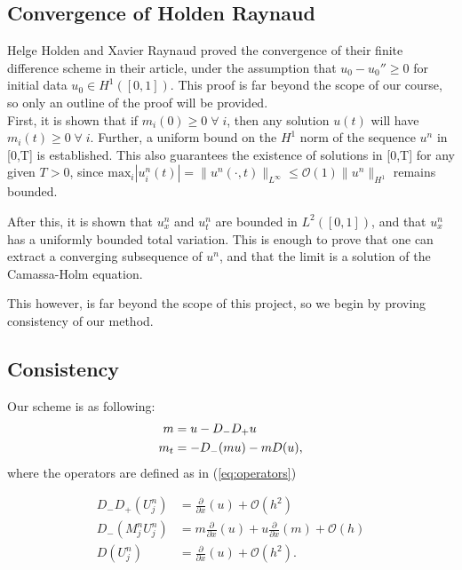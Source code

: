 \subsection*{Convergence of Holden Raynaud}
Helge Holden and Xavier Raynaud proved the convergence of their finite difference scheme in their article, under the assumption that $u_{0} - u_{0}'' \geq 0$ for initial data $u_{0} \in H^{1}([0,1])$. This proof is far beyond the scope of our course, so only an outline of the proof will be provided. \\

First, it is shown that if $m_{i}(0) \geq 0 \; \forall \;i$, then any solution $u(t)$ will have $m_{i}(t) \geq 0 \; \forall \;i $. Further, a uniform bound on the $H^{1}$ norm of the sequence $u^{n}$ in [0,T] is established. This also guarantees the existence of solutions in [0,T] for any given $T > 0$, since $\text{max}_{i}|u_{i}^{n}(t)| = \|u^{n}(\cdot,t)\|_{L^{\infty}} \leq \mathcal{O}(1) \|u^{n}\|_{H^{1}}$ remains bounded.

After this, it is shown that $u_{x}^{n}$ and $u_{t}^{n}$ are bounded in $L^{2}([0,1])$, and that $u_{x}^{n}$ has a uniformly bounded total variation. This is enough to prove that one can extract a converging subsequence of $u^{n}$, and that the limit is a solution of the Camassa-Holm equation. 

This however, is far beyond the scope of this project, so we begin by proving consistency of our method.

\subsection*{Consistency}
Our scheme is as following:
\begin{align}
m &= u - D_- D_+ u \notag \\
m_t &=- D_- ( m u ) - m D ( u ),
\label{eq:discretized}
\end{align}
where the operators are defined as in (\ref{eq:operators})

\begin{align*}
D_- D_+ \left( U_j^n \right)  &= \frac{\partial}{\partial x} (u) + \mathcal{O} \left( h^ 2 \right) \\
 D_- \left(M_j^n U_j^n \right) &= m \frac{\partial}{\partial x} (u) + u \frac{\partial}{\partial x} (m) + \mathcal{O} \left( h \right)  \\
D \left(U_j^n \right) &= \frac{\partial}{\partial x} (u) + \mathcal{O} \left( h^2 \right).
\end{align*}

